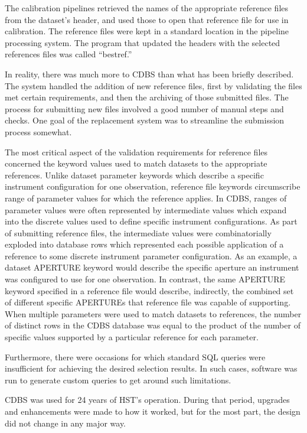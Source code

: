\documentclass[final,authoryear,5p,times,twocolumn]{elsarticle}
\begin{document}
The calibration pipelines retrieved the names of the appropriate reference
files from the dataset's header, and used those to open that reference file
for use in calibration. The reference files were kept in a standard location in
the pipeline processing system. The program that updated the headers with the
selected references files was called ``bestref.''

In reality, there was much more to CDBS than what has been briefly
described. The system handled the addition of new reference files, first by
validating the files met certain requirements, and then the archiving of those
submitted files. The process for submitting new files involved a good number of
manual steps and checks. One goal of the replacement system was to streamline
the submission process somewhat.

The most critical aspect of the validation requirements for reference files
concerned the keyword values used to match datasets to the appropriate
references.  Unlike dataset parameter keywords which describe a specific
instrument configuration for one observation, reference file keywords
circumscribe range of parameter values for which the reference applies.  In
CDBS, ranges of parameter values were often represented by intermediate values
which expand into the discrete values used to define specific instrument
configurations.  As part of submitting reference files, the intermediate values
were combinatorially exploded into database rows which represented each
possible application of a reference to some discrete instrument parameter
configuration.  As an example, a dataset APERTURE keyword would describe the
specific aperture an instrument was configured to use for one observation. In
contrast, the same APERTURE keyword specified in a reference file would
describe, indirectly, the combined set of different specific APERTUREs that
reference file was capable of supporting.  When multiple parameters were used
to match datasets to references, the number of distinct rows in the CDBS
database was equal to the product of the number of specific values supported by
a particular reference for each parameter.

Furthermore, there were occasions for which standard SQL queries were
insufficient for achieving the desired selection results. In such cases,
software was run to generate custom queries to get around such limitations.

CDBS was used for 24 years of HST's operation. During that period, upgrades and
enhancements were made to how it worked, but for the most part, the design did
not change in any major way.
\end{document}
